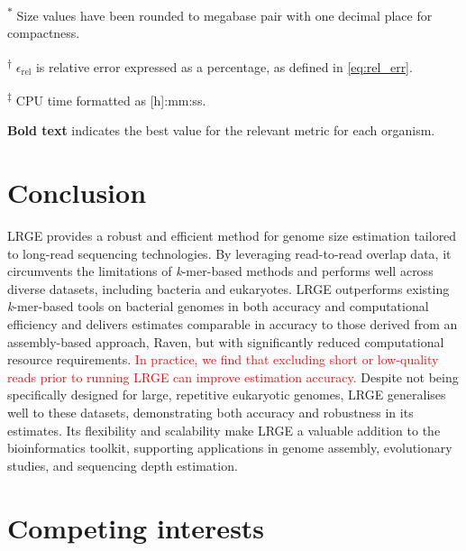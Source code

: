 \documentclass[unnumsec,webpdf,modern,large]{oup-authoring-template}
\theoremstyle{thmstyleone}%
\theoremstyle{thmstyletwo}%
\theoremstyle{thmstylethree}%
\newcommand{\lrge}{LRGE}
\newcommand{\relerr}{$\epsilon_{\text{rel}}$}
\newcommand{\kmer}{\textit{k}-mer}
\newcommand{\changed}[1]{\textcolor{red}{#1}}
\begin{document}
\begin{table}[t]
\begin{tabular*}{\textwidth}{@{}lccrlrrrr@{}}
\end{tabular*}
\begin{tablenotes}%
\item \textsuperscript{$\ast$} Size values have been rounded to megabase pair with one decimal place for compactness.
\item \textsuperscript{$\dagger$} \relerr{} is relative error expressed as a percentage, as defined in \autoref{eq:rel_err}.
\item \textsuperscript{$\ddagger$} CPU time formatted as [h]:mm:ss.
\item \textbf{Bold text} indicates the best value for the relevant metric for each organism.
\end{tablenotes}
\end{table}



\section{Conclusion}

\lrge{} provides a robust and efficient method for genome size estimation tailored to long-read sequencing technologies. By leveraging read-to-read overlap data, it circumvents the limitations of \kmer{}-based methods and performs well across diverse datasets, including bacteria and eukaryotes. \lrge{} outperforms existing \kmer{}-based tools on bacterial genomes in both accuracy and computational efficiency and delivers estimates comparable in accuracy to those derived from an assembly-based approach, Raven, but with significantly reduced computational resource requirements. \changed{In practice, we find that excluding short or low-quality reads prior to running \lrge{} can improve estimation accuracy.} Despite not being specifically designed for large, repetitive eukaryotic genomes, \lrge{} generalises well to these datasets, demonstrating both accuracy and robustness in its estimates. Its flexibility and scalability make \lrge{} a valuable addition to the bioinformatics toolkit, supporting applications in genome assembly, evolutionary studies, and sequencing depth estimation.


\section{Competing interests}
\end{document}
